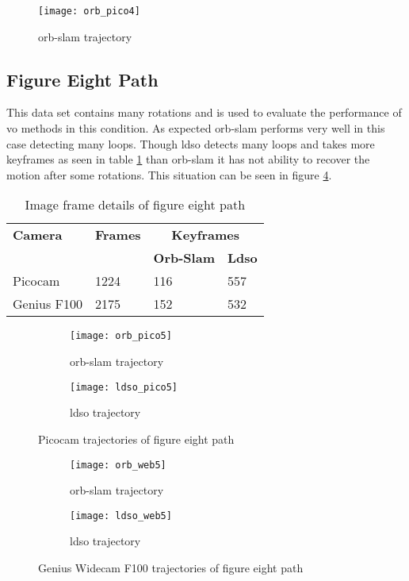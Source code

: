 \begin{figure}[H]
	\centering
	\texttt{[image: orb\_pico4]}
	\caption{\acrshort{orb}-\acrshort{slam} trajectory}
	\label{fig:orb_pico4}
\end{figure}

\subsection{Figure Eight Path}
This data set contains many rotations and is used to evaluate the performance of \acrshort{vo} methods in this condition. As expected \acrshort{orb}-\acrshort{slam} performs very well in this case detecting many loops. Though \acrshort{ldso} detects many loops and takes more keyframes as seen in table \ref{table:eight} than \acrshort{orb}-\acrshort{slam} it has not ability to recover the motion after some rotations. This situation can be seen in figure \ref{fig:Pico5}. 
\begin{table}[H]
	\centering
	\renewcommand{\arraystretch}{1.5}
	\begin{tabular}{ l| l| l |l }
		\textbf{Camera} & \textbf{Frames} & \multicolumn{2}{c}{\textbf{Keyframes}}  \\    
		&      & \textbf{Orb-Slam}  & \textbf{Ldso}  \\
		\hline
		Picocam & 1224 &  116  & 557 \\ 
		\hline
		Genius F100 & 2175 &  152  & 532 \\ 
	\end{tabular}
	\caption{Image frame details of figure eight path}
	\label{table:eight}
\end{table}

\begin{figure}[H]
	\begin{subfigure}{.6\textwidth}
		\centering
		\texttt{[image: orb\_pico5]}
		\caption{\acrshort{orb}-\acrshort{slam} trajectory}
		\label{fig:orb_pico5}
	\end{subfigure}
	\begin{subfigure}{.6\textwidth}
		\centering
		\texttt{[image: ldso\_pico5]}
		\caption{\acrshort{ldso} trajectory}
		\label{fig:ldso_pico5}
	\end{subfigure}
	\caption{Picocam trajectories of figure eight path}
	\label{fig:Pico5}
\end{figure}
\begin{figure}[H]
	\begin{subfigure}{.6\textwidth}
		\centering
		\texttt{[image: orb\_web5]}
		\caption{\acrshort{orb}-\acrshort{slam} trajectory}
		\label{fig:orb_web5}
	\end{subfigure}%
	\begin{subfigure}{.6\textwidth}
		\centering
		\texttt{[image: ldso\_web5]}
		\caption{\acrshort{ldso} trajectory}
		\label{fig:ldso_web5}
	\end{subfigure}
	\caption{Genius Widecam F100 trajectories of figure eight path}
	\label{fig:Web5}
\end{figure}

